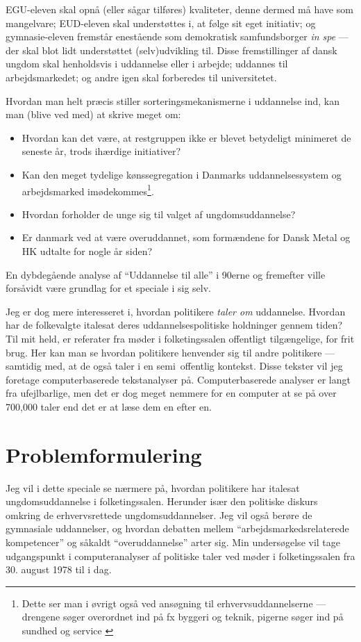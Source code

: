 EGU-eleven skal opnå (eller sågar tilføres) kvaliteter, denne dermed må have som mangelvare; EUD-eleven skal understøttes i, at følge sit eget initiativ; og gymnasie-eleven fremstår enestående som demokratisk samfundsborger \textit{in spe} — der skal blot lidt understøttet (selv)udvikling til.
Disse fremstillinger af dansk ungdom skal henholdsvis i uddannelse eller i arbejde; uddannes til arbejdsmarkedet; og andre igen skal forberedes til universitetet.

Hvordan man helt præcis stiller sorteringsmekanismerne i uddannelse ind, kan man (blive ved med) at skrive meget om:
\begin{itemize}
  \item
    Hvordan kan det være, at restgruppen ikke er blevet betydeligt minimeret de seneste år, trods ihærdige initiativer?
  \item
    Kan den meget tydelige kønssegregation i Danmarks uddannelsessystem og arbejdsmarked imødekommes\footnote{Dette ser man i øvrigt også ved ansøgning til erhvervsuddannelserne — drengene søger overordnet ind på fx byggeri og teknik, pigerne søger ind på sundhed og service \autocite[s. 48]{danmarksstatistikErhvervsuddannelserDanmark20192019}}.
  \item
    Hvordan forholder de unge sig til valget af ungdomsuddannelse?
  \item
    Er danmark ved at være overuddannet, som formændene for Dansk Metal og HK udtalte for nogle år siden? \autocite{simonsenLadOsGore2016}
\end{itemize}

En dybdegående analyse af “Uddannelse til alle” i 90erne og fremefter ville forsåvidt være grundlag for et speciale i sig selv.

Jeg er dog mere interesseret i, hvordan politikere \textit{taler om} uddannelse.
Hvordan har de folkevalgte italesat deres uddannelsespolitiske holdninger gennem tiden?
Til mit held, er referater fra møder i folketingssalen offentligt tilgængelige, for frit brug.
Her kan man se hvordan politikere henvender sig til andre politikere — samtidig med, at de også taler i en semi\ offentlig kontekst.
Disse tekster vil jeg foretage computerbaserede tekstanalyser på.
Computerbaserede analyser er langt fra ufejlbarlige, men det er dog meget nemmere for en computer at se på over 700,000 taler end det er at læse dem en efter en.

\chapter{Problemformulering}\label{chap:pf}
Jeg vil i dette speciale se nærmere på, hvordan politikere har italesat ungdomsuddannelse i folketingssalen.
Herunder især den politiske diskurs omkring de erhvervsrettede ungdomsuddannelser.
Jeg vil også berøre de gymnasiale uddannelser, og hvordan debatten mellem “arbejdsmarkedsrelaterede kompetencer” og såkaldt “overuddannelse” arter sig.
Min undersøgelse vil tage udgangspunkt i computeranalyser af politiske taler ved møder i folketingssalen fra 30. august 1978 til i dag.

